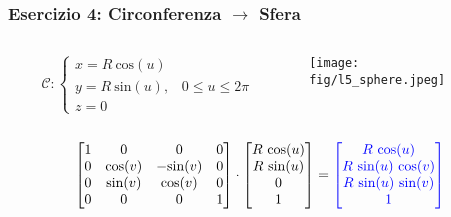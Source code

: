 \documentclass{beamer}
\newcommand{\fig}{./figures} %
\newcommand{\msin}{\mbox{sin}} %
\newcommand{\mcos}{\mbox{cos}} %
\begin{document}
\begin{frame}
\frametitle{Esercizio 4: Circonferenza $\rightarrow$ Sfera}
\begin{columns}
\begin{column}{0.58\textwidth}
\begin{displaymath}
\mathcal{C}:
\begin{cases}
x = R~\mcos(u)\\
y = R~\msin(u), \;\;\;0\le u\le 2\pi\\
z = 0
\end{cases}
\end{displaymath}
\end{column}
\begin{column}{0.39\textwidth}
\texttt{[image: \\fig/l5\_sphere.jpeg]}

\end{column}
\end{columns}
%
\vspace{0.1\textheight}
\begin{displaymath}
\begin{bmatrix}
1 & 0 & 0 & 0\\
0 & \mcos(v) & -\msin(v) & 0\\
0 & \msin(v)   & \mcos(v) & 0\\
0 & 0   & 0 & 1
\end{bmatrix}
\cdot
\begin{bmatrix}
R~\mcos(u)\\
R~\msin(u)\\
0\\
1
\end{bmatrix}
= 
{\color{blue}
\begin{bmatrix}
R ~\mcos(u)\\
R ~\msin(u)~\mcos(v)\\
R ~\msin(u)~\msin(v)\\
1
\end{bmatrix}
}
\end{displaymath}
\end{frame}
\end{document}

